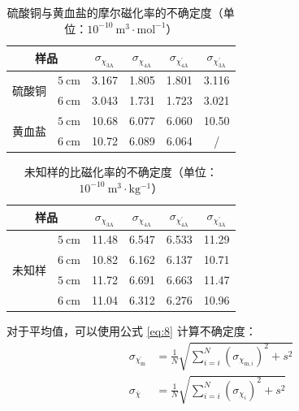 \documentclass[cn,hazy,pku,12pt,normal,math=newtx,cite=super]{elegantnote}
\begin{document}
\begin{table}[H]
    \centering
    \caption{硫酸铜与黄血盐的摩尔磁化率的不确定度（单位：$10^{-10} \mathrm{~m^3\cdot mol^{-1}}$）}
    \begin{tabular}{cccccc}
        \toprule
        \multicolumn{2}{c}{样品} & $\sigma_{\chi_{3\mathrm{A}}}$ & $\sigma_{\chi_{4\mathrm{A}} }$ &  $\sigma_{\chi_{4\mathrm{A}}^\prime}$ &   $\sigma_{\chi_{3\mathrm{A}}^\prime }$\\
        \midrule
        \multirow{2}{*}{硫酸铜} & $5 \mathrm{~cm}$ & 3.167 & 1.805 & 1.801 & 3.116  \\
        & $6 \mathrm{~cm}$ & 3.043 & 1.731 & 1.723 & 3.021  \\
        \midrule
        \multirow{2}{*}{黄血盐} & $5 \mathrm{~cm}$ & 10.68 & 6.077 & 6.060 & 10.50  \\
        & $6 \mathrm{~cm}$ & 10.72 & 6.089 & 6.064 & /  \\
        \bottomrule
    \end{tabular}
    \label{tab:6}
\end{table}

\begin{table}[H]
    \centering
    \caption{未知样的比磁化率的不确定度（单位：$10^{-10} \mathrm{~m^3\cdot kg^{-1}}$）}
\begin{tabular}{cccccc}
\toprule
    \multicolumn{2}{c}{样品} & $\sigma_{\chi_{3\mathrm{A}}}$ & $\sigma_{\chi_{4\mathrm{A}} }$ &  $\sigma_{\chi_{4\mathrm{A}}^\prime}$ &   $\sigma_{\chi_{3\mathrm{A}}^\prime }$\\
    \midrule
    \multirow{4}{*}{未知样} & $5 \mathrm{~cm}$ & 11.48 & 6.547 & 6.533 & 11.29  \\
    & $6 \mathrm{~cm}$ & 10.82 & 6.162 & 6.137 & 10.71  \\
    & $5 \mathrm{~cm}$ & 11.72 & 6.691 & 6.663 & 11.47  \\
    & $6 \mathrm{~cm}$ & 11.04 & 6.312 & 6.276 & 10.96  \\
    \bottomrule
    \end{tabular}
    \label{tab:7}
\end{table}

对于平均值，可以使用公式 \eqref{eq:8} 计算不确定度：
\begin{equation}\label{eq:8}
    \begin{aligned}
        \sigma_{\bar{\chi_{\mathrm{m}}}}&=\frac{1}{N} \sqrt{\sum_{i=i}^N\left(\sigma_{\chi_{\mathrm{m},i}}\right)^2+s^2} \\
        \sigma_{\bar{\chi}}&=\frac{1}{N} \sqrt{\sum_{i=i}^N\left(\sigma_{\chi_{i}}\right)^2+s^2} \\
    \end{aligned}
\end{equation}
\end{document}
